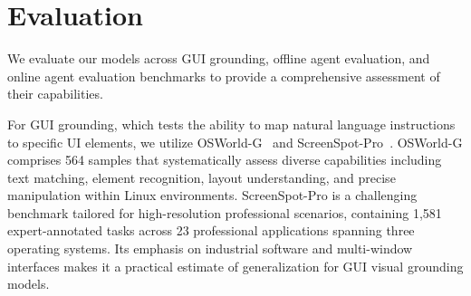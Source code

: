 \documentclass{article}
\theoremstyle{plain}
\theoremstyle{definition}
\theoremstyle{remark}
\begin{document}
\section{Evaluation}
\label{sec: agent evaluation}
We evaluate our models across GUI grounding, offline agent evaluation, and online agent evaluation benchmarks to provide a comprehensive assessment of their capabilities.

For GUI grounding, which tests the ability to map natural language instructions to specific UI elements, we utilize OSWorld-G~\citep{xie2025scaling} and ScreenSpot-Pro~\citep{li2025screenspot}. OSWorld-G comprises 564 samples that systematically assess diverse capabilities including text matching, element recognition, layout understanding, and precise manipulation within Linux environments. ScreenSpot-Pro is a challenging benchmark tailored for high-resolution professional scenarios, containing 1,581 expert-annotated tasks across 23 professional applications spanning three operating systems. Its emphasis on industrial software and multi-window interfaces makes it a practical estimate of generalization for GUI visual grounding models.
\end{document}
